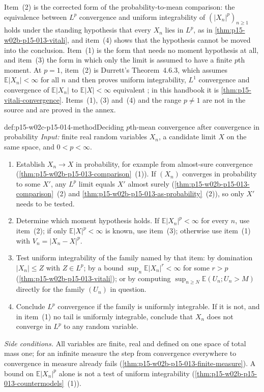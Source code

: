 Item~(2) is the corrected form of the probability-to-mean comparison:
the equivalence between \(L^p\) convergence and uniform integrability of
\((|X_n|^p)_{n\geq1}\) holds under the standing hypothesis that every
\(X_n\) lies in \(L^p\), as in \cref{thm:p15-w02b-p15-013-vitali}, and
item~(4) shows that the hypothesis cannot be moved into the conclusion.
Item~(1) is the form that needs no moment hypothesis at all, and
item~(3) the form in which only the limit is assumed to have a finite
\(p\)th moment. At \(p=1\), item~(2) is Durrett's Theorem~4.6.3, which
assumes \(\mathbb E|X_n|<\infty\) for all \(n\) and then proves
uniform integrability, \(L^1\) convergence and convergence of
\(\mathbb E|X_n|\) to \(\mathbb E|X|<\infty\) equivalent
\cite[Theorem~4.6.3, p.~245]{DurrettPTEAuthor2019}; in this handbook it
is \cref{thm:p15-vitali-convergence}. Items~(1), (3) and~(4) and the
range \(p\neq1\) are not in the source and are proved in the annex.

\begin{hbmethod}{def:p15-w02c-p15-014-method}{Deciding \(p\)th-mean convergence after convergence in probability}
\emph{Input:} finite real random variables \(X_n\), a candidate limit
\(X\) on the same space, and \(0<p<\infty\).
\begin{enumerate}
\item Establish \(X_n\to X\) in probability, for example from
      almost-sure convergence (\cref{thm:p15-w02b-p15-013-comparison}~(1)).
      If \((X_n)\) converges in probability to some \(X'\), any
      \(L^p\) limit equals \(X'\) almost surely
      (\cref{thm:p15-w02b-p15-013-comparison}~(2) and
      \cref{thm:p15-w02b-p15-013-as-probability}~(2)), so only \(X'\)
      needs to be tested.
\item Determine which moment hypothesis holds. If
      \(\mathbb E|X_n|^p<\infty\) for every \(n\), use item~(2); if only
      \(\mathbb E|X|^p<\infty\) is known, use item~(3); otherwise use
      item~(1) with \(V_n=|X_n-X|^p\).
\item Test uniform integrability of the family named by that item:
      by domination \(|X_n|\leq Z\) with \(Z\in L^p\); by a bound
      \(\sup_n\mathbb E|X_n|^r<\infty\) for some \(r>p\)
      (\cref{thm:p15-w02b-p15-013-vitali}); or by computing
      \(\sup_{n\geq N}\mathbb E(U_n;U_n>M)\) directly for the family
      \((U_n)\) in question.
\item Conclude \(L^p\) convergence if the family is uniformly
      integrable. If it is not, and in item~(1) no tail is uniformly
      integrable, conclude that \(X_n\) does not converge in \(L^p\)
      to any random variable.
\end{enumerate}
\emph{Side conditions.} All variables are finite, real and defined on
one space of total mass one; for an infinite measure the step from
convergence everywhere to convergence in measure already fails
(\cref{thm:p15-w02b-p15-013-finite-measure}). A bound on
\(\mathbb E|X_n|^p\) alone is not a test of uniform integrability
(\cref{thm:p15-w02b-p15-013-countermodels}~(1)).
\end{hbmethod}

